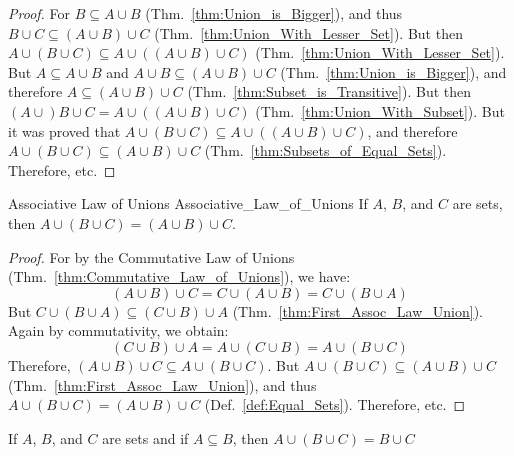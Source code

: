         \begin{proof}
            For $B\subseteq{A}\cup{B}$
            (Thm.~\ref{thm:Union_is_Bigger}), and thus
            $B\cup{C}\subseteq(A\cup{B})\cup{C}$
            (Thm.~\ref{thm:Union_With_Lesser_Set}). But then
            $A\cup(B\cup{C})\subseteq{A}%
             \cup((A\cup{B})\cup{C})$
            (Thm.~\ref{thm:Union_With_Lesser_Set}).
            But $A\subseteq{A}\cup{B}$ and
            $A\cup{B}\subseteq(A\cup{B})\cup{C}$
            (Thm.~\ref{thm:Union_is_Bigger}), and therefore
            $A\subseteq(A\cup{B})\cup{C}$
            (Thm.~\ref{thm:Subset_is_Transitive}). But then
            $(A\cup)B\cup{C}={A}\cup((A\cup{B})\cup{C})$
            (Thm.~\ref{thm:Union_With_Subset}). But it was
            proved that
            $A\cup(B\cup{C})\subseteq{A}%
             \cup((A\cup{B})\cup{C})$, and therefore
            $A\cup(B\cup{C})\subseteq(A\cup{B})\cup{C}$
            (Thm.~\ref{thm:Subsets_of_Equal_Sets}).
            Therefore, etc.
        \end{proof}
        \begin{ltheorem}{Associative Law of Unions}
              {Associative_Law_of_Unions}
            If $A$, $B$, and $C$ are sets, then
            $A\cup(B\cup{C})=(A\cup{B})\cup{C}$.
        \end{ltheorem}
        \begin{proof}
            For by the Commutative Law of Unions
            (Thm.~\ref{thm:Commutative_Law_of_Unions}),
            we have:
            \begin{equation}
                (A\cup{B})\cup{C}=C\cup(A\cup{B})
                                 =C\cup(B\cup{A})
            \end{equation}
            But $C\cup(B\cup{A})\subseteq(C\cup{B})\cup{A}$
            (Thm.~\ref{thm:First_Assoc_Law_Union}). Again by
            commutativity, we obtain:
            \begin{equation}
                (C\cup{B})\cup{A}=A\cup(C\cup{B})=A\cup(B\cup{C})
            \end{equation}
            Therefore,
            $(A\cup{B})\cup{C}\subseteq{A}\cup(B\cup{C})$.
            But $A\cup(B\cup{C})\subseteq(A\cup{B})\cup{C}$
            (Thm.~\ref{thm:First_Assoc_Law_Union}),
            and thus $A\cup(B\cup{C})=(A\cup{B})\cup{C}$
            (Def.~\ref{def:Equal_Sets}). Therefore, etc.
        \end{proof}
        \begin{theorem}
            \label{thm:Redundant_Union}%
            If $A$, $B$, and $C$ are sets and if $A\subseteq{B}$, then
            $A\cup(B\cup{C})=B\cup{C}$
        \end{theorem}
